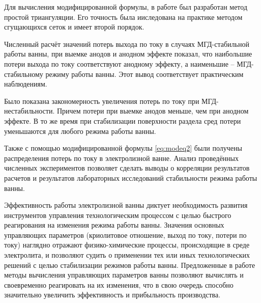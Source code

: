 \documentclass{article}
\begin{document}
Для вычисления модифицированной формулы, в работе был разработан метод простой триангуляции. Его точность была ииследована на практике методом
сгущающихся сеток и имеет второй порядок.

Численный расчёт значений потерь выхода по току в случаях МГД-стабильной работы ванны, при выемке анодов и анодном эффекте показал, что наибольшие потери выхода по току соответствуют анодному эффекту, а наименьшие – МГД-стабильному режиму работы ванны. Этот вывод соответствует практическим наблюдениям.

Было показана закономерность увеличения потерь по току при МГД-нестабильности. Причем потери при выемке анодов меньше, чем при анодном эффекте. В то же время при стабилизации поверхности раздела сред потери уменьшаются для любого режима работы ванны.

Также с помощью модифицированной формулы \ref{eq:modeq2} были получены распределения потерь по току в электролизной ванне. Анализ проведённых численных экспериментов позволяет сделать выводы о корреляции результатов расчетов и результатов лабораторных исследований стабильности режима работы ванны.

Эффективность работы электролизной ванны диктует необходимость развития инструментов управления технологическим процессом с целью быстрого реагирования на изменения режима работы ванны. Значения основных управляющих параметров (криолитовое отношение, выход по току, потери по току) наглядно отражают физико-химические процессы, происходящие в среде электролита, и позволяют судить о применении тех или иных технологических решений с целью стабилизации режимов работы ванны. Предложенные в работе методы вычисления управляющих параметров ванны позволяют вычислять и своевременно реагировать на их изменения, что в свою очередь способно значительно увеличить эффективность и прибыльность производства.
\end{document}
